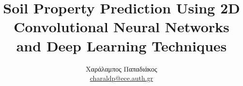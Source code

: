 \documentclass[a4paper,12pt]{report}
\def\tl{\textlatin}
\begin{document}


\title{\tl{Soil Property Prediction Using 2D Convolutional Neural Networks and Deep Learning Techniques}}
\author{Χαράλαμπος Παπαδιάκος \\
\href{mailto:charaldp@ece.auth.gr}{\tl{charaldp@ece.auth.gr}}}
\maketitle

\tableofcontents
\listoffigures
\listoftables








\appendix





\end{document}
